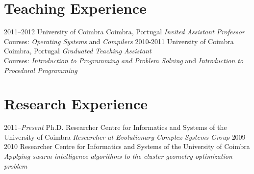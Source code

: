 \documentclass[]{friggeri-cv} %
\begin{document}

\section{Teaching Experience}

\begin{entrylist}
\entry
{2011--2012}
{University of Coimbra}
{Coimbra, Portugal}
{\emph{Invited Assistant Professor} \\
Courses: \emph{Operating Systems} and \emph{Compilers}}
\entry
{2010-2011}
{University of Coimbra}
{Coimbra, Portugal}
{\emph{Graduated Teaching Assistant } \\
Courses: \emph{Introduction to Programming and Problem Solving} and \emph{Introduction to Procedural Programming}}
\end{entrylist}


\section{Research Experience}

\begin{entrylist}
\entry
{2011--\emph{Present}}
{Ph.D. Researcher}
{Centre for Informatics and Systems of the University of Coimbra}
{\emph{Researcher at Evolutionary Complex Systems Group}}
\entry
{2009-2010}
{Researcher}
{Centre for Informatics and Systems of the University of Coimbra}
{\emph{Applying swarm intelligence algorithms to the cluster geometry optimization problem}}
\end{entrylist}


\vfill\eject


\end{document}
